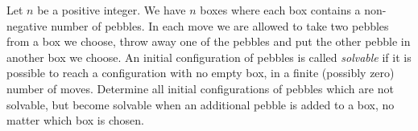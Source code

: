 Let $n$ be a positive integer. We have $n$ boxes where each box contains a non-negative number of pebbles. In each move we are allowed to take two pebbles from a box we choose, throw away one of the pebbles and put the other pebble in another box we choose. An initial configuration of pebbles is called \emph{solvable} if it is possible to reach a configuration with no empty box, in a finite (possibly zero) number of moves. Determine all initial configurations of pebbles which are not solvable, but become solvable when an additional pebble is added to a box, no matter which box is chosen.